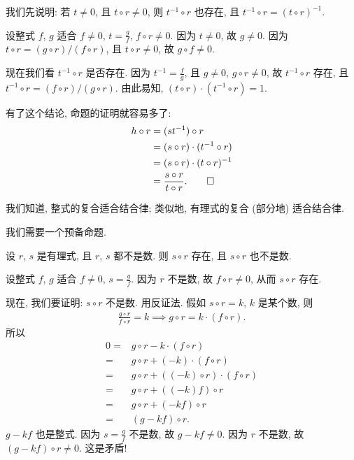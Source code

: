 \begin{pf}
    我们先说明: 若 $t \neq 0$, 且 $t \circ r \neq 0$, 则 $t^{-1} \circ r$ 也存在, 且 $t^{-1} \circ r = (t \circ r)^{-1}$.

    设整式 $f$, $g$ 适合 $f \neq 0$, $t = \frac{g}{f}$, $f \circ r \neq 0$. 因为 $t \neq 0$, 故 $g \neq 0$. 因为 $t \circ r = {(g \circ r)}/{(f \circ r)}$, 且 $t \circ r \neq 0$, 故 $g \circ f \neq 0$.

    现在我们看 $t^{-1} \circ r$ 是否存在. 因为 $t^{-1} = \frac{f}{g}$, 且 $g \neq 0$, $g \circ r \neq 0$, 故 $t^{-1} \circ r$ 存在, 且 $t^{-1} \circ r = {(f \circ r)}/{(g \circ r)}$. 由此易知, $(t \circ r) \cdot (t^{-1} \circ r) = 1$.

    有了这个结论, 命题的证明就容易多了:
    \begin{align*}
        h \circ r
        = {} & (s t^{-1}) \circ r                    \\
        = {} & (s \circ r) \cdot (t^{-1} \circ r)    \\
        = {} & (s \circ r) \cdot (t \circ r)^{-1}    \\
        = {} & \frac{s \circ r}{t \circ r}. \qedhere
    \end{align*}
\end{pf}

我们知道, 整式的复合适合结合律; 类似地, 有理式的复合 (部分地) 适合结合律.

我们需要一个预备命题.
\begin{proposition}
    设 $r$, $s$ 是有理式, 且 $r$, $s$ 都不是数. 则 $s \circ r$ 存在, 且 $s \circ r$ 也不是数.
\end{proposition}

\begin{pf}
    设整式 $f$, $g$ 适合 $f \neq 0$, $s = \frac{g}{f}$. 因为 $r$ 不是数, 故 $f \circ r \neq 0$, 从而 $s \circ r$ 存在.

    现在, 我们要证明: $s \circ r$ 不是数. 用反证法. 假如 $s \circ r = k$, $k$ 是某个数, 则
    \begin{align*}
        \frac{g \circ r}{f \circ r} = k \implies g \circ r = k \cdot (f \circ r).
    \end{align*}
    所以
    \begin{align*}
        0
        = {} & g \circ r - k \cdot (f \circ r)              \\
        = {} & g \circ r + (-k) \cdot (f \circ r)           \\
        = {} & g \circ r + ((-k) \circ r) \cdot (f \circ r) \\
        = {} & g \circ r + ((-k)f) \circ r                  \\
        = {} & g \circ r + (-kf) \circ r                    \\
        = {} & (g - kf) \circ r.
    \end{align*}
    $g - kf$ 也是整式. 因为 $s = \frac{g}{f}$ 不是数, 故 $g - kf \neq 0$. 因为 $r$ 不是数, 故 $(g - kf) \circ r \neq 0$. 这是矛盾!
\end{pf}

